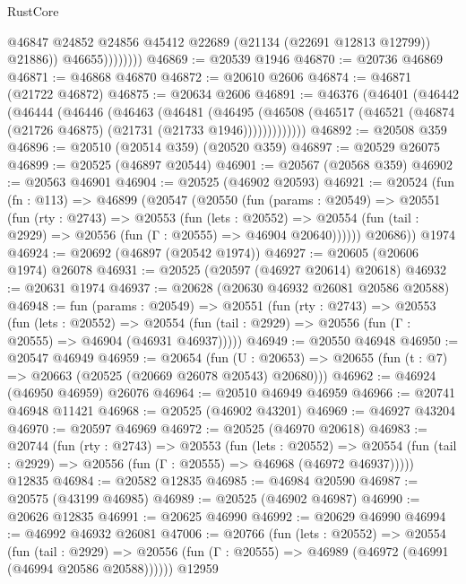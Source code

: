 \begin{lexlean}{RustCore}
\begin{coremodule}
                        @46847
                        @24852
                        @24856
                        @45412
                        @22689
                        (@21134 (@22691 @12813 @12799))
                        @21886))
                    @46655))))))))
@46869 := @20539 @1946
@46870 := @20736 @46869
@46871 := @46868 @46870
@46872 := @20610 @2606
@46874 := @46871 (@21722 @46872)
@46875 := @20634 @2606
@46891 := @46376
    (@46401
      (@46442
        (@46444
          (@46446
            (@46463
              (@46481
                (@46495
                  (@46508 (@46517 (@46521 (@46874 (@21726 @46875) (@21731 (@21733 @1946)))))))))))))
@46892 := @20508 @359
@46896 := @20510 (@20514 @359) (@20520 @359)
@46897 := @20529 @26075
@46899 := @20525 (@46897 @20544)
@46901 := @20567 (@20568 @359)
@46902 := @20563 @46901
@46904 := @20525 (@46902 @20593)
@46921 := @20524
    (fun (fn : @113) =>
    @46899
      (@20547
        (@20550
          (fun (params : @20549) =>
          @20551
            (fun (rty : @2743) =>
            @20553
              (fun (lets : @20552) =>
              @20554 (fun (tail : @2929) => @20556 (fun (Γ : @20555) => @46904 @20640))))))
        @20686))
    @1974
@46924 := @20692 (@46897 (@20542 @1974))
@46927 := @20605 (@20606 @1974) @26078
@46931 := @20525 (@20597 (@46927 @20614) @20618)
@46932 := @20631 @1974
@46937 := @20628 (@20630 @46932 @26081 @20586 @20588)
@46948 := fun (params : @20549) =>
  @20551
    (fun (rty : @2743) =>
    @20553
      (fun (lets : @20552) =>
      @20554 (fun (tail : @2929) => @20556 (fun (Γ : @20555) => @46904 (@46931 @46937)))))
@46949 := @20550 @46948
@46950 := @20547 @46949
@46959 := @20654
    (fun (U : @20653) => @20655 (fun (t : @7) => @20663 (@20525 (@20669 @26078 @20543) @20680)))
@46962 := @46924 (@46950 @46959) @26076
@46964 := @20510 @46949 @46959
@46966 := @20741 @46948 @11421
@46968 := @20525 (@46902 @43201)
@46969 := @46927 @43204
@46970 := @20597 @46969
@46972 := @20525 (@46970 @20618)
@46983 := @20744
    (fun (rty : @2743) =>
    @20553
      (fun (lets : @20552) =>
      @20554 (fun (tail : @2929) => @20556 (fun (Γ : @20555) => @46968 (@46972 @46937)))))
    @12835
@46984 := @20582 @12835
@46985 := @46984 @20590
@46987 := @20575 (@43199 @46985)
@46989 := @20525 (@46902 @46987)
@46990 := @20626 @12835
@46991 := @20625 @46990
@46992 := @20629 @46990
@46994 := @46992 @46932 @26081
@47006 := @20766
    (fun (lets : @20552) =>
    @20554
      (fun (tail : @2929) =>
      @20556 (fun (Γ : @20555) => @46989 (@46972 (@46991 (@46994 @20586 @20588))))))
    @12959

\end{coremodule}
\end{lexlean}
